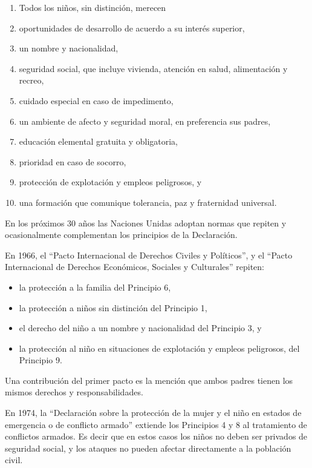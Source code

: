 \documentclass{tufte-handout}
\begin{document}
\begin{enumerate}
\item{Todos los niños, sin distinción, merecen}
\item{oportunidades de desarrollo de acuerdo a su interés superior,}
\item{un nombre y nacionalidad,}
\item{seguridad social, que incluye vivienda, atención en salud, alimentación y recreo,}
\item{cuidado especial en caso de impedimento,}
\item{un ambiente de afecto y seguridad moral, en preferencia sus padres,}
\item{educación elemental gratuita y obligatoria,}
\item{prioridad en caso de socorro,}
\item{protección de explotación y empleos peligrosos, y}
\item{una formación que comunique tolerancia, paz y fraternidad universal.}
\end{enumerate}

En los próximos 30 años las Naciones Unidas adoptan normas que repiten y ocasionalmente complementan los principios de la Declaración.

En 1966, el “Pacto Internacional de Derechos Civiles y Políticos”, y el “Pacto Internacional de Derechos Económicos, Sociales y Culturales” repiten:

\begin{itemize}
\item{la protección a la familia del Principio 6,}
\item{la protección a niños sin distinción del Principio 1,}
\item{el derecho del niño a un nombre y nacionalidad del Principio 3, y}
\item{la protección al niño en situaciones de explotación y empleos peligrosos, del Principio 9.}
\end{itemize}

Una contribución del primer pacto es la mención que ambos padres tienen los mismos derechos y responsabilidades.

En 1974, la “Declaración sobre la protección de la mujer y el niño en estados de emergencia o de conflicto armado” extiende los Principios 4 y 8 al tratamiento de conflictos armados. Es decir que en estos casos los niños no deben ser privados de seguridad social, y los ataques no pueden afectar directamente a la población civil.
\end{document}
